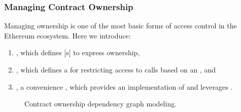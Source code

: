 \subsubsection{Managing Contract Ownership}

Managing  ownership is one of the most basic forms of access
control in the Ethereum ecosystem. Here we introduce:

\begin{enumerate}
  \item {}, which defines [s] to
    express  ownership,
  \item {}, which defines a  for
    restricting access to  calls based on an , and
  \item {}, a convenience , which provides an
    implementation of  and leverages
    .
\end{enumerate}

\begin{figure}[H]
    \centering
    \caption{Contract ownership dependency graph modeling.}\label{fig:ownership}
\end{figure}






